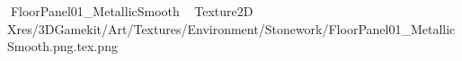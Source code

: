    FloorPanel01_MetallicSmooth             	   Texture2D
   X   res/3DGamekit/Art/Textures/Environment/Stonework/FloorPanel01_MetallicSmooth.png.tex.png